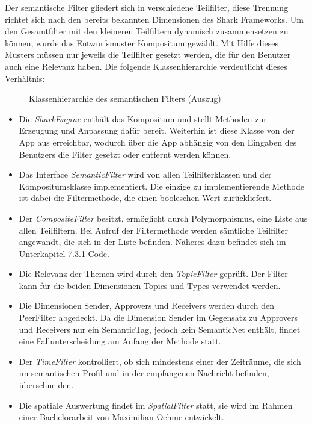 Der semantische Filter gliedert sich in verschiedene Teilfilter, diese Trennung richtet sich nach den bereits bekannten Dimensionen des Shark Frameworks. Um den Gesamtfilter mit den kleineren Teilfiltern dynamisch zusammensetzen zu können, wurde das Entwurfsmuster Kompositum gewählt. Mit Hilfe dieses Musters müssen nur jeweils die Teilfilter gesetzt werden, die für den Benutzer auch eine Relevanz haben. Die folgende Klassenhierarchie verdeutlicht dieses Verhältnis:
\begin{figure}[H]
	\centering
	\hspace*{1cm}
	\caption{Klassenhierarchie des semantischen Filters (Auszug)}
	\label{fig:broadcastStructure2}
\end{figure} 
\begin{itemize}
	\item Die \textit{SharkEngine} enthält das Kompositum und stellt Methoden zur Erzeugung und Anpassung dafür bereit. Weiterhin ist diese Klasse von der App aus erreichbar, wodurch über die App abhängig von den Eingaben des Benutzers die Filter gesetzt oder entfernt werden können.
	\item Das Interface \textit{SemanticFilter} wird von allen Teilfilterklassen und der Kompositumsklasse implementiert. Die einzige zu implementierende Methode ist dabei die Filtermethode, die einen booleschen Wert zurückliefert.
	\item Der \textit{CompositeFilter} besitzt, ermöglicht durch Polymorphismus, eine Liste aus allen Teilfiltern. Bei Aufruf der Filtermethode werden sämtliche Teilfilter angewandt, die sich in der Liste befinden. Näheres dazu befindet sich im Unterkapitel 7.3.1 Code. 
	\item Die Relevanz der Themen wird durch den \textit{TopicFilter} geprüft. Der Filter kann für die beiden Dimensionen Topics und Types verwendet werden.
	\item Die Dimensionen Sender, Approvers und Receivers werden durch den PeerFilter abgedeckt. Da die Dimension Sender im Gegensatz zu Approvers und Receivers nur ein SemanticTag, jedoch kein SemanticNet enthält, findet eine Fallunterscheidung am Anfang der Methode statt.
	\item Der \textit{TimeFilter} kontrolliert, ob sich mindestens einer der Zeiträume, die sich im semantischen Profil und in der empfangenen Nachricht befinden, überschneiden. 
	\item Die spatiale Auswertung findet im \textit{SpatialFilter} statt, sie wird im Rahmen einer Bachelorarbeit von Maximilian Oehme entwickelt.
\end{itemize}


